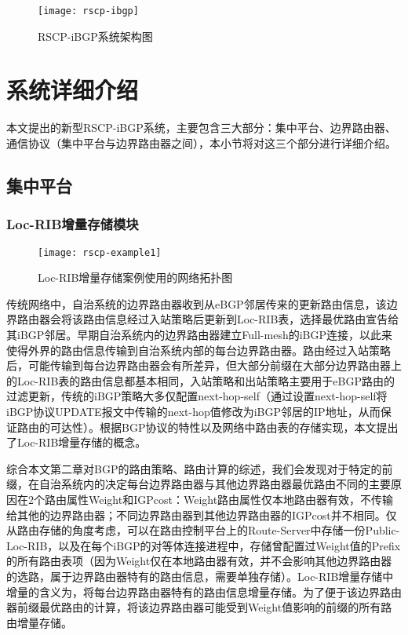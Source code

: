 \begin{figure}
  \centering
  \texttt{[image: rscp-ibgp]}
  \caption{RSCP-iBGP系统架构图}
  \label{fig:rscp-ibgp}
\end{figure}

\section{系统详细介绍}
本文提出的新型RSCP-iBGP系统，主要包含三大部分：集中平台、边界路由器、通信协议（集中平台与边界路由器之间），本小节将对这三个部分进行详细介绍。
\subsection{集中平台}
\subsubsection{Loc-RIB增量存储模块}

\begin{figure}
  \centering
  \texttt{[image: rscp-example1]}
  \caption{Loc-RIB增量存储案例使用的网络拓扑图}
  \label{fig:rscp-example1}
\end{figure}

传统网络中，自治系统的边界路由器收到从eBGP邻居传来的更新路由信息，该边界路由器会将该路由信息经过入站策略后更新到Loc-RIB表，选择最优路由宣告给其iBGP邻居。早期自治系统内的边界路由器建立Full-mesh的iBGP连接，以此来使得外界的路由信息传输到自治系统内部的每台边界路由器。路由经过入站策略后，可能传输到每台边界路由器会有所差异，但大部分前缀在大部分边界路由器上的Loc-RIB表的路由信息都基本相同，入站策略和出站策略主要用于eBGP路由的过滤更新，传统的iBGP策略大多仅配置next-hop-self（通过设置next-hop-self将iBGP协议UPDATE报文中传输的next-hop值修改为iBGP邻居的IP地址，从而保证路由的可达性）。根据BGP协议的特性以及网络中路由表的存储实现，本文提出了Loc-RIB增量存储的概念。

综合本文第二章对BGP的路由策略、路由计算的综述，我们会发现对于特定的前缀，在自治系统内的决定每台边界路由器与其他边界路由器最优路由不同的主要原因在2个路由属性Weight和IGPcost：Weight路由属性仅本地路由器有效，不传输给其他的边界路由器；不同边界路由器到其他边界路由器的IGPcost并不相同。仅从路由存储的角度考虑，可以在路由控制平台上的Route-Server中存储一份Public-Loc-RIB，以及在每个iBGP的对等体连接进程中，存储曾配置过Weight值的Prefix的所有路由表项（因为Weight仅在本地路由器有效，并不会影响其他边界路由器的选路，属于边界路由器特有的路由信息，需要单独存储）。Loc-RIB增量存储中增量的含义为，将每台边界路由器特有的路由信息增量存储。为了便于该边界路由器前缀最优路由的计算，将该边界路由器可能受到Weight值影响的前缀的所有路由增量存储。



